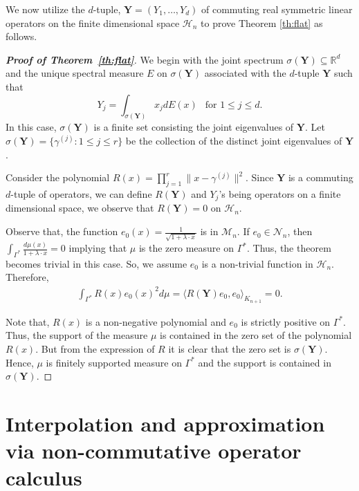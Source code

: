 \documentclass[11pt,reqno]{amsart}
\theoremstyle{plain}
\theoremstyle{definition}
\numberwithin{equation}{section}
\begin{document}
	We now utilize the $d$-tuple, $\mathbf{Y}=(Y_1, \dots, Y_d)$ of commuting real symmetric linear operators on the finite dimensional space $\mathcal{H}_n$ to prove Theorem \ref{th:flat} as follows.
	
	\begin{proof}[\textbf{Proof of Theorem~\ref{th:flat}}]
		We begin with the joint spectrum $\sigma(\mathbf{Y}) \subseteq \mathbb{R}^d$ and the unique spectral measure $E$ on $\sigma(\mathbf{Y})$ associated with the $d$-tuple $\mathbf{Y}$ such that
		$$
		Y_j = \int_{\sigma(\mathbf{Y})} x_j dE(x) \ \ \text{ for } 1\leq j \leq d.
		$$
		In this case, $\sigma(\mathbf{Y})$ is a finite set consisting the joint eigenvalues of $\mathbf{Y}$. Let $\sigma(\mathbf{Y})= \{\gamma^{(j)}: 1\leq j \leq r \}$ be the collection of the distinct joint eigenvalues of $\mathbf{Y}$.
		
		Consider the polynomial $R(x) = \prod_{j=1}^r \|x-\gamma^{(j)}\|^2$. Since $\mathbf{Y}$ is a commuting $d$-tuple of operators, we can define $R(\mathbf{Y})$ and $Y_j$'s being operators on a finite dimensional space, we observe that $R(\mathbf{Y}) = 0$ on $\mathcal{H}_n$. 
		
		Observe that, the function $e_0(x)= \frac{1}{\sqrt{1+ \lambda \cdot x}}$ is in $\mathcal{M}_n$. If $e_0 \in \mathcal{N}_n$, then $\int_{\Gamma^*} \frac{d\mu(x)}{1+\lambda \cdot x} =0$ implying that $\mu$ is the zero measure on $\Gamma^*$. Thus, the theorem becomes trivial in this case. So, we assume $e_0$ is a non-trivial function in $\mathcal{H}_n$. Therefore,
		\begin{align*}
			\int_{\Gamma^*} R(x) e_0(x)^2 d\mu= \langle R(\mathbf{Y}) e_0, e_0\rangle_{K_{n+1}} =0.
		\end{align*}
		
		Note that, $R(x)$ is a non-negative polynomial and $e_0$ is strictly positive on $\Gamma^*$. Thus, the support of the measure $\mu$ is contained in the zero set of the polynomial $R(x)$. But from the expression of $R$ it is clear that the zero set is $\sigma(\mathbf{Y})$.
		Hence, $\mu$ is finitely supported measure on $\Gamma^*$ and the support is contained in $\sigma(\mathbf{Y})$. 
	\end{proof}



  

	
	\section{Interpolation and approximation via non-commutative operator calculus}\label{Sec:NC}
	
\end{document}
